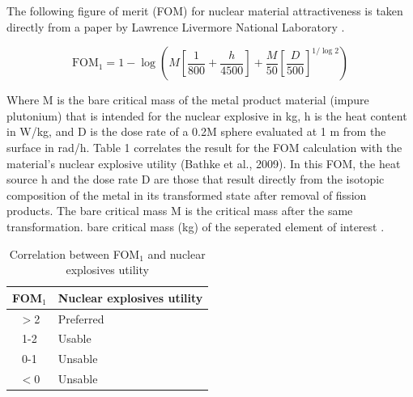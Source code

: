 The following figure of merit (FOM) for nuclear material attractiveness is taken directly from a paper by Lawrence Livermore National Laboratory \cite{King2010TheScenario}. 

\begin{equation}
    \text{FOM}_1 = 1-\log\left( M\left[\frac{1}{800} + \frac{h}{4500}\right] +\frac{M}{50}\left[\frac{D}{500}\right]^{1/\log2}\right)
\end{equation}

\begin{displayquote}
Where M is the bare critical mass of the metal product material (impure plutonium) that is intended for the nuclear explosive in kg, h is the heat content in W/kg, and D is the dose rate of a 0.2M sphere evaluated at 1 m from the surface in rad/h. Table 1 correlates the result for the FOM calculation with the material's nuclear explosive utility (Bathke et al., 2009). In this FOM, the heat source h and the dose rate D are those that result directly from the isotopic composition of the metal in its transformed state after removal of fission products. The bare critical mass M is the critical mass after the same transformation. bare critical mass (kg) of the seperated element of interest \cite{King2010TheScenario}.
\end{displayquote}

\begin{table}[H]
\centering
\caption{Correlation between FOM$_1$ and nuclear explosives utility \cite{King2010TheScenario}}
\label{tab:figure_labels}
\renewcommand{\arraystretch}{1.4}
\begin{tabular}{c l}
\toprule
\textbf{FOM$_1$} & \textbf{Nuclear explosives utility} \\
\midrule
$>$2 & Preferred \\
1-2 & Usable \\
0-1 & Unsable \\
$<$0 & Unsable \\
\bottomrule
\end{tabular}
\end{table}